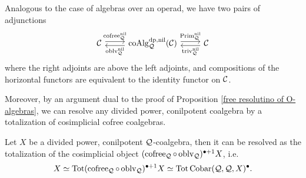Analogous to the case of algebras over an operad, we have two pairs of adjunctions 
\[
\begin{tikzcd}
\CC & \coAlg^{\divpow, \nil}_{\CQ}(\CC) & \CC
	\arrow[from=1-1, to= 1-2, shift left = 1, "\cofree^{\nil}_{\CQ}" above]
	\arrow[from=1-2, to=1-1, shift left = 1, "\oblv^{\nil}_{\CQ}" below]
	\arrow[from=1-2, to= 1-3, shift left = 1, "\operatorname{Prim}^{\nil}_{\CQ}" above]
	\arrow[from=1-3, to=1-2, shift left = 1, "\trivial^{\nil}_{\CQ}" below]
\end{tikzcd}
\]
where the right adjoints are above the left adjoints,
and compositions of the horizontal functors are equivalent to the identity functor on ${\mathcal{C}}$.

Moreover, by an argument dual to the proof of Proposition \ref{free resolutino of O-algebras}, we can resolve any divided power, conilpotent coalgebra by a totalization of cosimplicial cofree coalgebras.
\begin{proposition}
Let $X$ be a divided power, conilpotent ${\mathcal{Q}}$-coalgebra, then it can be resolved as the totalization of the cosimplicial object $(\operatorname{cofree}_{{\mathcal{Q}}}\circ \operatorname{oblv}_{{\mathcal{Q}}})^{\bullet + 1}X$, i.e. 
\begin{equation}
\label{(3.6)}
    X \simeq
\operatorname{\operatorname{Tot}} (\operatorname{cofree}_{{\mathcal{Q}}}\circ \operatorname{oblv}_{{\mathcal{Q}}})^{\bullet + 1}X
\simeq \operatorname{\operatorname{Tot}} \operatorname{Cobar}({\mathcal{Q}}, {\mathcal{Q}}, X)^{\bullet}.
\end{equation}
\end{proposition}



